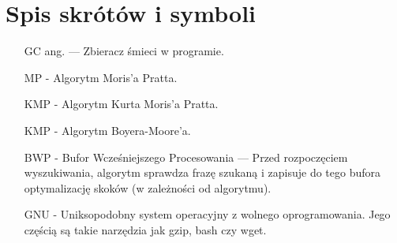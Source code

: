 \chapter{Spis skrótów i symboli}

\begin{itemize}
\item[GC] ang.  — Zbieracz śmieci w programie.
\item[MP] - Algorytm Moris'a Pratta.
\item[KMP] - Algorytm Kurta Moris'a Pratta.
\item[KMP] - Algorytm Boyera-Moore'a.
\item[BWP] - Bufor Wcześniejszego Procesowania — Przed rozpoczęciem wyszukiwania, algorytm sprawdza frazę szukaną i zapisuje do tego bufora
optymalizację skoków (w zależności od algorytmu).\label{skrót:BWP}
\item[GNU] - Uniksopodobny system operacyjny z wolnego oprogramowania. Jego 
częścią są takie narzędzia jak gzip, bash czy wget. \label{skrót:GNU}
\end{itemize}
